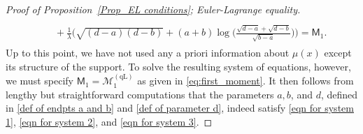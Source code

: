 \documentclass{amsart}
\theoremstyle{plain}
\theoremstyle{remark}
\numberwithin{equation}{section}
\begin{document}
\begin{proof}[Proof of Proposition~\ref{Prop_EL conditions}; Euler-Lagrange equality]
\begin{align}
\begin{split}
\\
&\quad +\frac{1}{\lambda} \bigg( \sqrt{(d-a) (d-b)}+(a+b) \log \Big(\frac{\sqrt{d-a}+\sqrt{d-b}}{\sqrt{b-a}}\Big) \bigg) = \mathsf{M}_1. \label{eqn for system 3}
\end{split}
\end{align}
Up to this point, we have not used any a priori information about $\mu(x)$ except its structure of the support. To solve the resulting system of equations, however, we must specify $\mathsf{M}_1=\mathcal{M}_1^{(\mathrm{qL})}$ as given in \eqref{eq:first_moment}. It then follows from lengthy but straightforward computations that the parameters $a,b$, and $d$, defined in \eqref{def of endpts a and b} and \eqref{def of parameter d}, indeed satisfy \eqref{eqn for system 1}, \eqref{eqn for system 2}, and \eqref{eqn for system 3}.


\end{proof}
\end{document}
